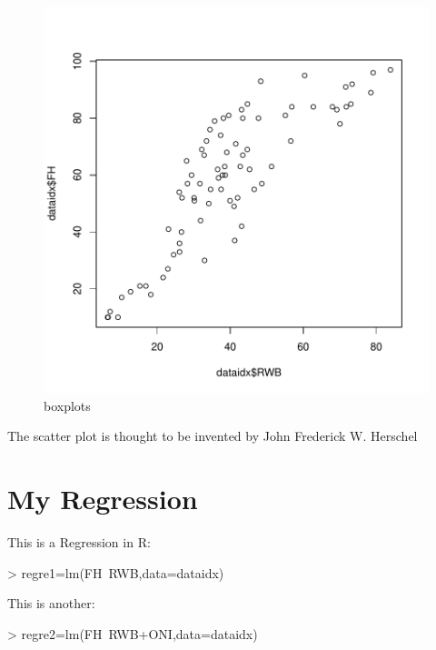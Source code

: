 \documentclass[11pt]{article}
\begin{document}
\begin{figure}[h]
\centering
\begin{adjustbox}{width=7cm,height=5.5cm,clip,trim=0cm 1cm 0cm 0cm} 
\includegraphics{PaperInR_8-numnum_plot}
\end{adjustbox}
\caption{boxplots}  %
\label{numnum_plot} %
\end{figure}


The scatter plot is thought to be invented by  John Frederick W. Herschel \cite{friendly_early_2005}


\section{My Regression}\label{regre}

This is a Regression in R:

\begin{Schunk}
\begin{Sinput}
> regre1=lm(FH~RWB,data=dataidx)
\end{Sinput}
\end{Schunk}

This is another:

\begin{Schunk}
\begin{Sinput}
> regre2=lm(FH~RWB+ONI,data=dataidx)
\end{Sinput}
\end{Schunk}
\end{document}
